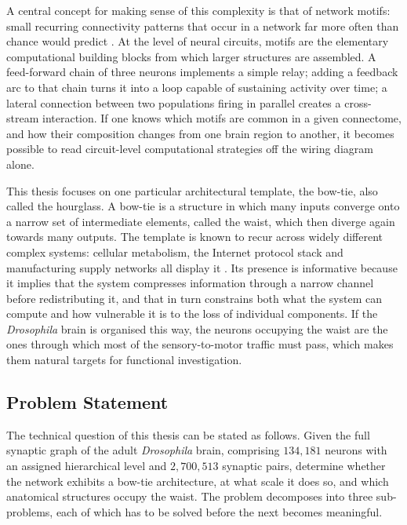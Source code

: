 \documentclass[12pt,a4paper,oneside]{article}
\theoremstyle{definition}
\theoremstyle{plain}
\newcommand{\Dros}{\textit{Drosophila}}
\begin{document}
A central concept for making sense of this complexity is that of network
motifs: small recurring connectivity patterns that occur in a network far
more often than chance would predict \cite{milo2002}. At the level of neural
circuits, motifs are the elementary computational building blocks from which
larger structures are assembled. A feed-forward chain of three neurons
implements a simple relay; adding a feedback arc to that chain turns it into
a loop capable of sustaining activity over time; a lateral connection
between two populations firing in parallel creates a cross-stream
interaction. If one knows which motifs are common in a given connectome, and
how their composition changes from one brain region to another, it becomes
possible to read circuit-level computational strategies off the wiring
diagram alone.

This thesis focuses on one particular architectural template, the bow-tie,
also called the hourglass. A bow-tie is a structure in which many inputs
converge onto a narrow set of intermediate elements, called the waist, which
then diverge again towards many outputs. The template is known to recur
across widely different complex systems: cellular metabolism, the Internet
protocol stack and manufacturing supply networks all display it
\cite{sabrin2020}. Its presence is informative because it implies that the
system compresses information through a narrow channel before redistributing
it, and that in turn constrains both what the system can compute and how
vulnerable it is to the loss of individual components. If the \Dros{} brain
is organised this way, the neurons occupying the waist are the ones through
which most of the sensory-to-motor traffic must pass, which makes them
natural targets for functional investigation.

\subsection{Problem Statement}
\label{sec:problem}

The technical question of this thesis can be stated as follows. Given the
full synaptic graph of the adult \Dros{} brain, comprising $134{,}181$
neurons with an assigned hierarchical level and $2{,}700{,}513$ synaptic
pairs, determine whether the network exhibits a bow-tie architecture, at
what scale it does so, and which anatomical structures occupy the waist. The
problem decomposes into three sub-problems, each of which has to be solved
before the next becomes meaningful.
\end{document}
